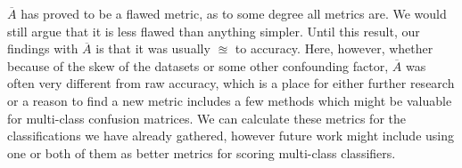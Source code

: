 $\overline{A}$ has proved to be a flawed metric, as to some degree all metrics are. We would still argue that it is less flawed than anything simpler.  Until this result, our findings with $\overline{A}$ is that it was usually $\approxeq$ to accuracy.  Here, however, whether because of the skew of the datasets or some other confounding factor, $\overline{A}$ was often very different from raw accuracy, which is a place for either further research or a reason to find a new metric \cite{jurman} includes a few methods which might be valuable for multi-class confusion matrices.  We can calculate these metrics for the classifications we have already gathered, however future work might include using one or both of them as better metrics for scoring multi-class classifiers.